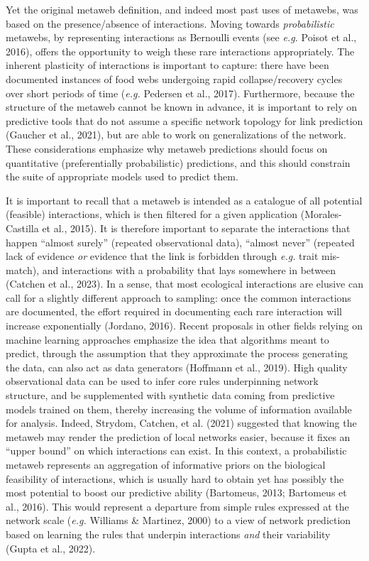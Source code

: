 \documentclass[11pt]{article}
\begin{document}
Yet the original metaweb definition, and indeed most past uses of
metawebs, was based on the presence/absence of interactions. Moving
towards \emph{probabilistic} metawebs, by representing interactions as
Bernoulli events (see \emph{e.g.} Poisot et al., 2016), offers the
opportunity to weigh these rare interactions appropriately. The inherent
plasticity of interactions is important to capture: there have been
documented instances of food webs undergoing rapid collapse/recovery
cycles over short periods of time (\emph{e.g.} Pedersen et al., 2017).
Furthermore, because the structure of the metaweb cannot be known in
advance, it is important to rely on predictive tools that do not assume
a specific network topology for link prediction (Gaucher et al., 2021),
but are able to work on generalizations of the network. These
considerations emphasize why metaweb predictions should focus on
quantitative (preferentially probabilistic) predictions, and this should
constrain the suite of appropriate models used to predict them.

It is important to recall that a metaweb is intended as a catalogue of
all potential (feasible) interactions, which is then filtered for a
given application (Morales-Castilla et al., 2015). It is therefore
important to separate the interactions that happen ``almost surely''
(repeated observational data), ``almost never'' (repeated lack of
evidence \emph{or} evidence that the link is forbidden through
\emph{e.g.} trait mis-match), and interactions with a probability that
lays somewhere in between (Catchen et al., 2023). In a sense, that most
ecological interactions are elusive can call for a slightly different
approach to sampling: once the common interactions are documented, the
effort required in documenting each rare interaction will increase
exponentially (Jordano, 2016). Recent proposals in other fields relying
on machine learning approaches emphasize the idea that algorithms meant
to predict, through the assumption that they approximate the process
generating the data, can also act as data generators (Hoffmann et al.,
2019). High quality observational data can be used to infer core rules
underpinning network structure, and be supplemented with synthetic data
coming from predictive models trained on them, thereby increasing the
volume of information available for analysis. Indeed, Strydom, Catchen,
et al. (2021) suggested that knowing the metaweb may render the
prediction of local networks easier, because it fixes an ``upper bound''
on which interactions can exist. In this context, a probabilistic
metaweb represents an aggregation of informative priors on the
biological feasibility of interactions, which is usually hard to obtain
yet has possibly the most potential to boost our predictive ability
(Bartomeus, 2013; Bartomeus et al., 2016). This would represent a
departure from simple rules expressed at the network scale (\emph{e.g.}
Williams \& Martinez, 2000) to a view of network prediction based on
learning the rules that underpin interactions \emph{and} their
variability (Gupta et al., 2022).
\end{document}
